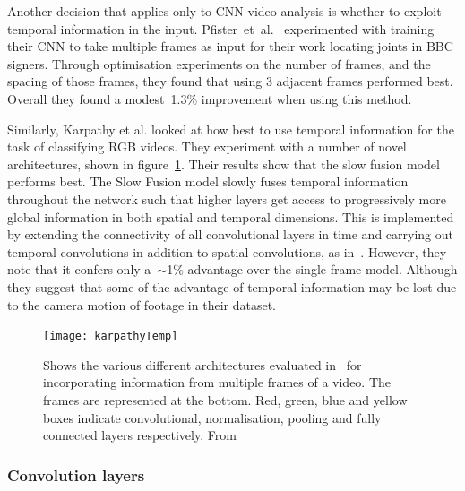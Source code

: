 \documentclass[11pt]{article} %
\begin{document}

Another decision that applies only to CNN video analysis is whether to exploit temporal information in the input. Pfister~et~al.~\cite{Pfister} experimented with training their CNN to take multiple frames as input for their work locating joints in BBC signers. Through optimisation experiments on the number of frames, and the spacing of those frames, they found that using 3 adjacent frames performed best. Overall they found a modest~1.3\% improvement when using this method. 

Similarly, Karpathy et al. looked at how best to use temporal information for the task of classifying RGB videos. They experiment with a number of novel architectures, shown in figure~\ref{fig:karp}. Their results show that the slow fusion model performs best. The Slow Fusion model slowly fuses temporal information throughout the network such that higher layers get access to progressively more global information in both spatial and temporal dimensions. This is implemented by extending the connectivity of all convolutional layers in time and carrying out temporal convolutions in addition to spatial convolutions, as in~\cite{Baccouche2011a,Ji2013}. However, they note that it confers only a~$\sim$1\% advantage over the single frame model. Although they suggest that some of the advantage of temporal information may be lost due to the camera motion of footage in their dataset. 



\begin{figure}
\texttt{[image: karpathyTemp]}
\caption{Shows the various different architectures evaluated in~\cite{Karpathy2014} for incorporating information from multiple frames of a video. The frames are represented at the bottom. Red, green, blue and yellow boxes indicate convolutional, normalisation, pooling and fully connected layers respectively. From~\cite{Karpathy2014}		\label{fig:karp}  } 
\end{figure}


\subsubsection{Convolution layers}
\end{document}
